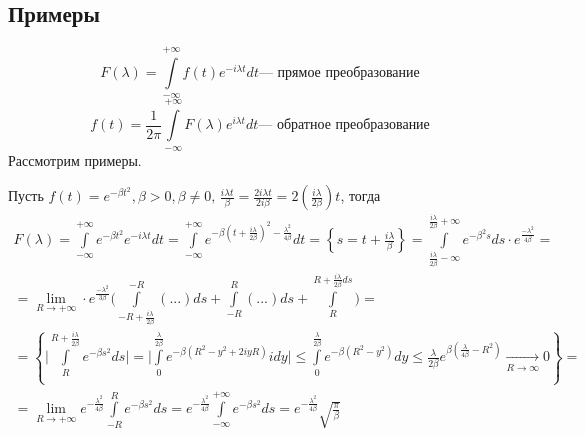\subsection{Примеры}

$$
	F(\lambda)=\int\limits_{-\infty}^{+\infty}{f(t)e^{-i\lambda t}dt} \mbox{--- прямое преобразование}
$$
$$
	f(t)=\frac{1}{2\pi}\int\limits_{-\infty}^{+\infty}{F(\lambda)e^{i\lambda t}dt} \mbox{--- обратное преобразование}
$$
Рассмотрим примеры. 
\begin{example}
Пусть $f(t)=e^{-\beta t^2}, \beta > 0, \beta \ne 0, \, \frac{i \lambda t}{\beta}=\frac{2i \lambda t}{2i \beta}=2(\frac{i \lambda}{2 \beta})t$, тогда
	$$
		\begin{array}{ll}
			F(\lambda) = \int\limits_{-\infty}^{+\infty}{e^{-\beta t^2}e^{-i\lambda t}dt}=\int\limits_{-\infty}^{+\infty}{e^{-\beta(t+\frac{i\lambda}{2\beta})^2-\frac{\lambda^2}{4\beta}}dt}=\left\{ s=t+\frac{i\lambda}{\beta} \right\}=\int\limits_{\frac{i\lambda}{2\beta}-\infty}^{\frac{i\lambda}{2\beta}+\infty}{e^{-\beta^2s}ds\cdot e^{\frac{-\lambda^2}{4\beta}}}=\\
			 =\lim_{R\to+\infty}\cdot e^{\frac{-\lambda^2}{3\beta}}\bigg( \int\limits_{-R+\frac{i\lambda}{2\beta}}^{-R}{(...)ds}+\int\limits_{-R}^{R}{(...)ds}+\int\limits_{R}^{R+\frac{i\lambda}{2\beta}ds} \bigg) =\\ =\left\{

		\bigg| \int\limits_{R}^{R+\frac{i\lambda}{2\beta}}{e^{-\beta s^2}ds}\bigg|
		=\bigg|\int\limits_{0}^{\frac{\lambda}{2\beta}}{e^{-\beta(R^2-y^2+2iyR)}idy}\bigg| \leq \int\limits_{0}^{\frac{\lambda}{2\beta}}{e^{-\beta (R^2-y^2)}dy} \leq \frac{\lambda}{2\beta}e^{\beta(\frac{\lambda}{4\beta}-R^2)} \underset{R \rightarrow \infty}{\longrightarrow} 0 \right\} =\\
		=\lim_{R\to +\infty}e^{-\frac{\lambda^2}{4\beta}} \int\limits_{-R}^{R}{e^{-\beta s^2}ds}=e^{-\frac{\lambda^2}{4\beta}}\int\limits_{-\infty}^{+\infty}e^{-\beta s^2}ds= e^{-\frac{\lambda^2}{4\beta}}\sqrt{\frac{\pi}{\beta}}

\end{array}
$$
\end{example}
